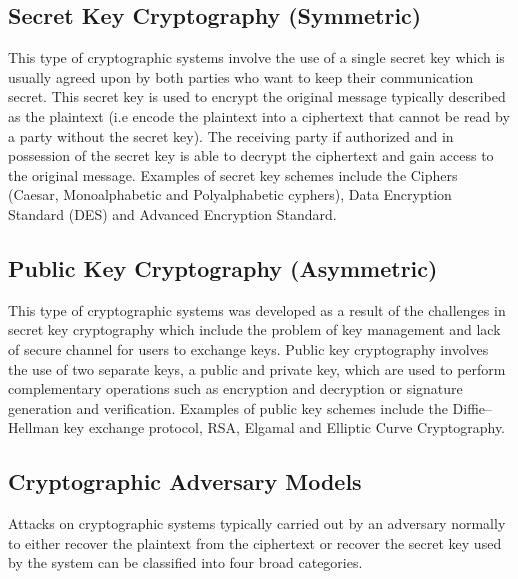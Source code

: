\subsection{Secret Key Cryptography (Symmetric)} This type of cryptographic systems involve the use of a single secret key which is usually agreed upon by both parties who want to keep their communication secret. This secret key is used to encrypt the original message typically described as the plaintext (i.e encode the plaintext into a ciphertext that cannot be read by a party without the secret key). The receiving party if authorized and in possession of the secret key is able to decrypt the ciphertext and gain access to the original message. Examples of secret key schemes include the Ciphers (Caesar, Monoalphabetic and Polyalphabetic cyphers), Data Encryption Standard (DES) and Advanced Encryption Standard. 

\subsection{Public Key Cryptography (Asymmetric)} This type of cryptographic systems was developed as a result of the challenges in secret key cryptography which include the problem of key management and lack of secure channel for users to exchange keys. Public key cryptography involves the use of two separate keys, a public and private key, which are used to perform complementary operations such as encryption and decryption or signature generation and verification. Examples of public key schemes include the Diffie–Hellman key exchange protocol, RSA, Elgamal and Elliptic Curve Cryptography.

\subsection{Cryptographic Adversary Models}

Attacks on cryptographic systems typically carried out by an adversary normally to either recover the plaintext from the ciphertext or recover the secret key used by the system can be classified into four broad categories.

